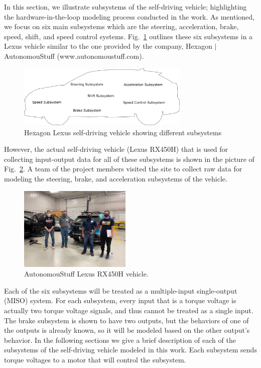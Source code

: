 \documentclass[conference]{IEEEtran}
\begin{document}
In this section, we illustrate subsystems of the self-driving vehicle; highlighting the hardware-in-the-loop modeling process conducted in the work. %
As mentioned, we focus on  six  main subsystems which are the steering, acceleration, brake, speed, shift, and speed control systems. Fig.~\ref{fig:highLevelSystemArchitecture} outlines these six subsystems in a Lexus vehicle similar to the one provided by the company, Hexagon $|$ AutonomouStuff (www.autonomoustuff.com). %
%
\begin{figure}[htbp]
  \centering
  \includegraphics[height=3cm]{figs/inkscape/carSystemModelOutline}
  \caption{Hexagon Lexus self-driving vehicle showing different subsystems}
  \label{fig:highLevelSystemArchitecture}
\end{figure}
%
However, the actual self-driving vehicle (Lexus RX450H) that is used for collecting input-output data for all of these subsystems is shown in the picture of Fig.~\ref{fig:lexusvehicle}. A team of the project members visited the site to collect raw data for modeling the steering, brake, and acceleration subsystems of the vehicle. %
%
\begin{figure}[htbp]
	\centering
	\includegraphics[height=4cm]{figs/img/picturesVisitToAStuff/visitors1-20211007}
	\caption{AutonomouStuff Lexus RX450H vehicle.}
	\label{fig:lexusvehicle}
\end{figure}
%


Each of the six subsystems will be treated as a multiple-input single-output (MISO) system. For each subsystem, every input that is a torque voltage is actually two torque voltage signals, and thus cannot be treated as a single input. The brake subsystem is shown to have two outputs, but the behaviors of one of the outputs is already known, so it will be modeled based on the other output's behavior. In the following sections we give a brief description of each of the subsystems of the self-driving vehicle modeled in this work. Each subsystem sends torque voltages to a motor that will control the subsystem.
\end{document}
